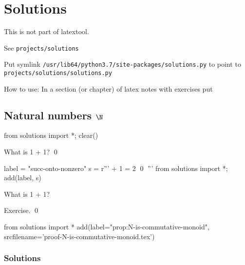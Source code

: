 \chapter{Solutions}

This is not part of latextool.

See \verb!projects/solutions!

Put symlink \verb!/usr/lib64/python3.7/site-packages/solutions.py!
to point to 
\verb!projects/solutions/solutions.py!

How to use: In a section (or chapter) of latex notes with exercises put
\begin{console}
\section{Natural numbers $\N$}
\begin{python0}
from solutions import *; clear()
\end{python0}

\begin{ex}
  \label{ex:succ-onto-nonzero}
  What is 1 + 1?
  \qed
\end{ex}
\begin{python0}
label = "succ-onto-nonzero"
s = r'''
 + 1 = 2
\qed
'''
from solutions import *; add(label, s)
\end{python0}

\begin{prop}
  \label{prop:N-is-commutative-monoid}
  What is 1 + 1?
\end{prop}

\proof
Exercise.
\qed
\begin{python0}
from solutions import *
add(label="prop:N-is-commutative-monoid",
    srcfilename='proof-N-is-commutative-monoid.tex')
\end{python0}

\newpage
\subsection{Solutions}



\end{console}
